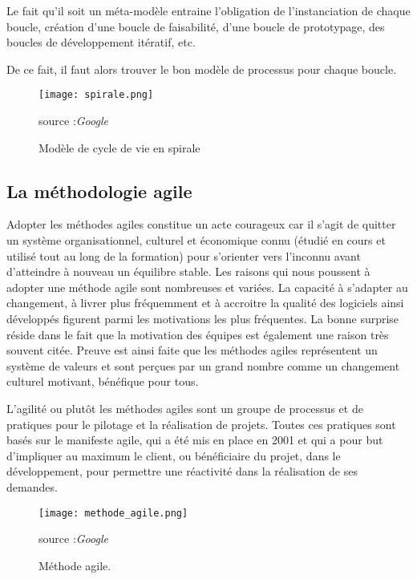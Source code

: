 {{	Le fait qu’il soit un méta-modèle entraine l’obligation de l’instanciation de chaque boucle, création d’une boucle de faisabilité, d’une boucle de prototypage, des boucles de développement itératif, etc.
	
De ce fait, il faut alors trouver le bon modèle de processus pour chaque boucle.

\begin{figure}[H]
	\centering
	\texttt{[image: spirale.png]}
	\caption{Modèle de cycle de vie en spirale}{ \begin{center} source :\textit{Google} \end{center}}
	\label{fig:spirale}
\end{figure}

\subsection{La méthodologie agile \cite{Ref1}}

Adopter les méthodes agiles constitue un acte courageux car il s’agit de quitter un système organisationnel, culturel et économique connu (étudié en cours et utilisé tout au long de la formation) pour s’orienter vers l’inconnu avant d’atteindre à nouveau un équilibre stable. Les raisons qui nous poussent à adopter une méthode agile sont nombreuses et variées. La capacité à s’adapter au changement, à livrer plus fréquemment et à accroitre la qualité des logiciels ainsi développés figurent parmi les motivations les plus fréquentes. La bonne surprise réside dans le fait que la motivation des équipes est également une raison très souvent citée. Preuve est ainsi faite que les méthodes agiles représentent un système de valeurs et sont perçues par un grand nombre comme un changement culturel motivant, bénéfique pour tous. 

L’agilité ou plutôt les méthodes agiles sont un groupe de processus et de pratiques pour le pilotage et la réalisation de projets. Toutes ces pratiques sont basés sur le manifeste agile, qui a été mis en place en 2001 et qui a pour but d’impliquer au maximum le client, ou bénéficiaire du projet, dans le développement, pour permettre une réactivité dans la réalisation de ses demandes. 

\begin{figure}[H]
	\centering
	\texttt{[image: methode\_agile.png]}
	\caption{Méthode agile.}{ \begin{center} source :\textit{Google} \end{center}}
	\label{fig:mvc}
\end{figure}

}}
